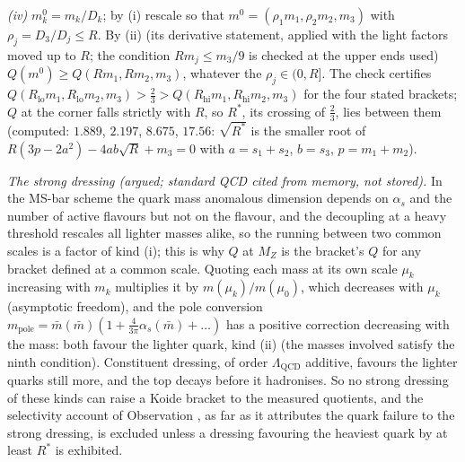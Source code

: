 \emph{(iv)} $m^{0}_{k} = m_{k}/D_{k}$; by (i) rescale so that $m^{0} = (\rho_{1}m_{1}, \rho_{2}m_{2}, m_{3})$ with $\rho_{j} = D_{3}/D_{j} \le R$. By (ii) (its derivative statement, applied with the light factors moved up to $R$; the condition $Rm_{j} \le m_{3}/9$ is checked at the upper ends used) $Q(m^{0}) \ge Q(Rm_{1}, Rm_{2}, m_{3})$, whatever the $\rho_{j} \in (0, R]$. The check certifies $Q(R_{\mathrm{lo}}m_{1}, R_{\mathrm{lo}}m_{2}, m_{3}) > \tfrac23 > Q(R_{\mathrm{hi}}m_{1}, R_{\mathrm{hi}}m_{2}, m_{3})$ for the four stated brackets; $Q$ at the corner falls strictly with $R$, so $R^{*}$, its crossing of $\tfrac23$, lies between them (computed: $1.889$, $2.197$, $8.675$, $17.56$: $\sqrt{R^{*}}$ is the smaller root of $R(3p - 2a^{2}) - 4ab\sqrt{R} + m_{3} = 0$ with $a = s_{1} + s_{2}$, $b = s_{3}$, $p = m_{1} + m_{2}$).

\emph{The strong dressing (argued; standard QCD cited from memory, not stored).} In the MS-bar scheme the quark mass anomalous dimension depends on $\alpha_{s}$ and the number of active flavours but not on the flavour, and the decoupling at a heavy threshold rescales all lighter masses alike, so the running between two common scales is a factor of kind (i); this is why $Q$ at $M_{Z}$ is the bracket's $Q$ for any bracket defined at a common scale. Quoting each mass at its own scale $\mu_{k}$ increasing with $m_{k}$ multiplies it by $m(\mu_{k})/m(\mu_{0})$, which decreases with $\mu_{k}$ (asymptotic freedom), and the pole conversion $m_{\mathrm{pole}} = \bar m(\bar m)(1 + \tfrac{4}{3\pi}\alpha_{s}(\bar m) + \dots)$ has a positive correction decreasing with the mass: both favour the lighter quark, kind (ii) (the masses involved satisfy the ninth condition). Constituent dressing, of order $\Lambda_{\mathrm{QCD}}$ additive, favours the lighter quarks still more, and the top decays before it hadronises. So no strong dressing of these kinds can raise a Koide bracket to the measured quotients, and the selectivity account of Observation , as far as it attributes the quark failure to the strong dressing, is excluded unless a dressing favouring the heaviest quark by at least $R^{*}$ is exhibited.
